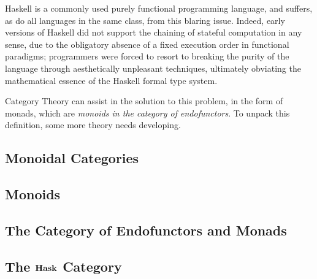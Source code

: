 \documentclass[10pt,a4paper]{amsart}
\begin{document}
Haskell is a commonly used purely functional programming language, and
suffers, as do all languages in the same class, from this blaring issue.
Indeed, early versions of Haskell did not support the chaining of stateful
computation in any sense, due to the obligatory absence of a fixed execution
order in functional paradigms; programmers were forced to resort to breaking the
purity of the language through aesthetically unpleasant techniques, ultimately
obviating the mathematical essence of the Haskell formal type system.

Category Theory can assist in the solution to this problem, in the form of
monads, which are \emph{monoids in the category of endofunctors}. To unpack this
definition, some more theory needs developing.

\subsection{Monoidal Categories}
\subsection{Monoids}
\subsection{The Category of Endofunctors and Monads}
\subsection{The $\operatorname{\text{\textbf{Hask}}}$ Category}

\printbibliography[title=Cited Works]
\end{document}
